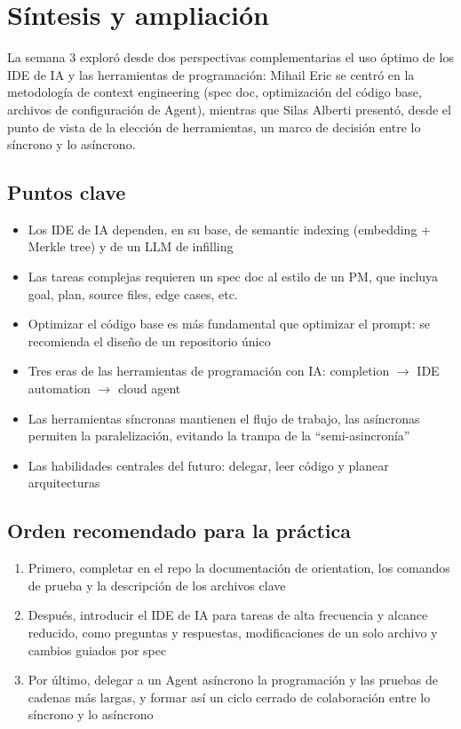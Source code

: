 \section{Síntesis y ampliación}

La semana 3 exploró desde dos perspectivas complementarias el uso óptimo de los IDE de IA y las herramientas de programación: Mihail Eric se centró en la metodología de context engineering (spec doc, optimización del código base, archivos de configuración de Agent), mientras que Silas Alberti presentó, desde el punto de vista de la elección de herramientas, un marco de decisión entre lo síncrono y lo asíncrono.

\subsection{Puntos clave}

\begin{itemize}
    \item Los IDE de IA dependen, en su base, de semantic indexing (embedding + Merkle tree) y de un LLM de infilling
    \item Las tareas complejas requieren un spec doc al estilo de un PM, que incluya goal, plan, source files, edge cases, etc.
    \item Optimizar el código base es más fundamental que optimizar el prompt: se recomienda el diseño de un repositorio único
    \item Tres eras de las herramientas de programación con IA: completion $\rightarrow$ IDE automation $\rightarrow$ cloud agent
    \item Las herramientas síncronas mantienen el flujo de trabajo, las asíncronas permiten la paralelización, evitando la trampa de la ``semi-asincronía''
    \item Las habilidades centrales del futuro: delegar, leer código y planear arquitecturas
\end{itemize}

\subsection{Orden recomendado para la práctica}

\begin{enumerate}
    \item Primero, completar en el repo la documentación de orientation, los comandos de prueba y la descripción de los archivos clave
    \item Después, introducir el IDE de IA para tareas de alta frecuencia y alcance reducido, como preguntas y respuestas, modificaciones de un solo archivo y cambios guiados por spec
    \item Por último, delegar a un Agent asíncrono la programación y las pruebas de cadenas más largas, y formar así un ciclo cerrado de colaboración entre lo síncrono y lo asíncrono
\end{enumerate}

